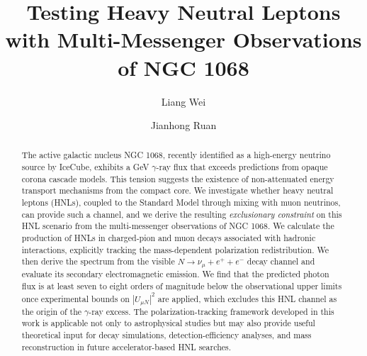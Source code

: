 \documentclass{ws-ijmpa}
\begin{document}

%
\catchline{}{}{}{}{}
%

\title{
  Testing Heavy Neutral Leptons \\
  with Multi-Messenger Observations of NGC 1068
}

\author{Liang Wei}

\address{School of Physics, East China Normal University, No. 500 Dongchuan Rd.\\
  Shanghai, China\\
  lwei@stu.ecnu.edu.cn}

\author{Jianhong Ruan}

\address{School of Physics, East China Normal University, No. 500 Dongchuan Rd.\\
  Shanghai, China\\
  jhruan@phy.ecnu.edu.cn}

\maketitle


\begin{abstract}
The active galactic nucleus NGC 1068, recently identified as a high-energy
neutrino source by IceCube, exhibits a GeV $\gamma$-ray flux that exceeds
predictions from opaque corona cascade models. This tension suggests the
existence of non-attenuated energy transport mechanisms from the compact
core. We investigate whether heavy neutral leptons (HNLs), coupled to the
Standard Model through mixing with muon neutrinos, can provide such a
channel, and we derive the resulting \emph{exclusionary constraint} on
this HNL scenario from the multi-messenger observations of NGC 1068. We
calculate the production of HNLs in charged-pion and muon decays associated
with hadronic interactions, explicitly tracking the mass-dependent
polarization redistribution. We then derive the spectrum from the visible
$N \to \nu_\mu + e^+ + e^-$ decay channel and evaluate its secondary
electromagnetic emission. We find that the predicted photon flux is at least
seven to eight orders of magnitude below the observational upper limits
once experimental bounds on $|U_{\mu N}|^2$ are applied, which excludes
this HNL channel as the origin of the $\gamma$-ray excess. The 
polarization-tracking framework developed in this work is 
applicable not only to astrophysical studies but may also 
provide useful theoretical input for decay simulations, 
detection-efficiency analyses, and mass reconstruction in 
future accelerator-based HNL searches.
\end{abstract}
\end{document}
